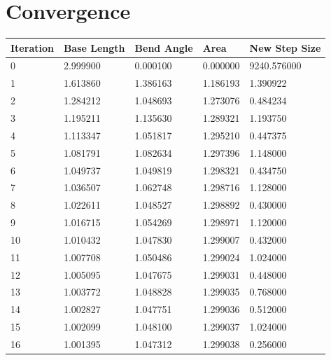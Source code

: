 \documentclass{article}
\begin{document}
\newpage
\section*{Convergence}
\begin{table}[h]
\begin{tabular}{|l|ll|l|l|}
\hline
Iteration & \multicolumn{1}{l|}{Base Length} & Bend Angle & Area     & New Step Size \\ \hline
0         & 2.999900                         & 0.000100   & 0.000000 & 9240.576000   \\ \hline
1         & 1.613860                         & 1.386163   & 1.186193 & 1.390922      \\ \hline
2         & 1.284212                         & 1.048693   & 1.273076 & 0.484234      \\ \hline
3         & 1.195211                         & 1.135630   & 1.289321 & 1.193750      \\ \hline
4         & 1.113347                         & 1.051817   & 1.295210 & 0.447375      \\ \hline
5         & 1.081791                         & 1.082634   & 1.297396 & 1.148000      \\ \hline
6         & 1.049737                         & 1.049819   & 1.298321 & 0.434750      \\ \hline
7         & 1.036507                         & 1.062748   & 1.298716 & 1.128000      \\ \hline
8         & 1.022611                         & 1.048527   & 1.298892 & 0.430000      \\ \hline
9         & 1.016715                         & 1.054269   & 1.298971 & 1.120000      \\ \hline
10        & 1.010432                         & 1.047830   & 1.299007 & 0.432000      \\ \hline
11        & 1.007708                         & 1.050486   & 1.299024 & 1.024000      \\ \hline
12        & 1.005095                         & 1.047675   & 1.299031 & 0.448000      \\ \hline
13        & 1.003772                         & 1.048828   & 1.299035 & 0.768000      \\ \hline
14        & 1.002827                         & 1.047751   & 1.299036 & 0.512000      \\ \hline
15        & 1.002099                         & 1.048100   & 1.299037 & 1.024000      \\ \hline
16        & 1.001395                         & 1.047312   & 1.299038 & 0.256000      \\ \hline
\end{tabular}
\end{table}
\end{document}
